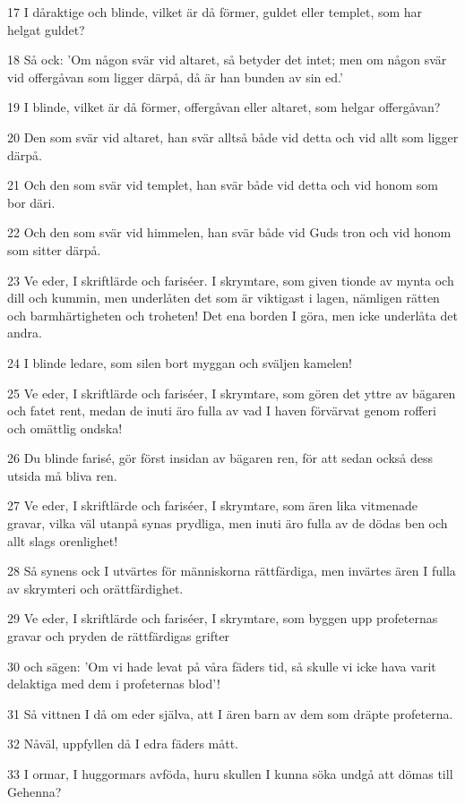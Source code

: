 \par 17 I dåraktige och blinde, vilket är då förmer, guldet eller templet, som har helgat guldet?
\par 18 Så ock: 'Om någon svär vid altaret, så betyder det intet; men om någon svär vid offergåvan som ligger därpå, då är han bunden av sin ed.'
\par 19 I blinde, vilket är då förmer, offergåvan eller altaret, som helgar offergåvan?
\par 20 Den som svär vid altaret, han svär alltså både vid detta och vid allt som ligger därpå.
\par 21 Och den som svär vid templet, han svär både vid detta och vid honom som bor däri.
\par 22 Och den som svär vid himmelen, han svär både vid Guds tron och vid honom som sitter därpå.
\par 23 Ve eder, I skriftlärde och fariséer. I skrymtare, som given tionde av mynta och dill och kummin, men underlåten det som är viktigast i lagen, nämligen rätten och barmhärtigheten och troheten! Det ena borden I göra, men icke underlåta det andra.
\par 24 I blinde ledare, som silen bort myggan och sväljen kamelen!
\par 25 Ve eder, I skriftlärde och fariséer, I skrymtare, som gören det yttre av bägaren och fatet rent, medan de inuti äro fulla av vad I haven förvärvat genom rofferi och omättlig ondska!
\par 26 Du blinde farisé, gör först insidan av bägaren ren, för att sedan också dess utsida må bliva ren.
\par 27 Ve eder, I skriftlärde och fariséer, I skrymtare, som ären lika vitmenade gravar, vilka väl utanpå synas prydliga, men inuti äro fulla av de dödas ben och allt slags orenlighet!
\par 28 Så synens ock I utvärtes för människorna rättfärdiga, men invärtes ären I fulla av skrymteri och orättfärdighet.
\par 29 Ve eder, I skriftlärde och fariséer, I skrymtare, som byggen upp profeternas gravar och pryden de rättfärdigas grifter
\par 30 och sägen: 'Om vi hade levat på våra fäders tid, så skulle vi icke hava varit delaktiga med dem i profeternas blod'!
\par 31 Så vittnen I då om eder själva, att I ären barn av dem som dräpte profeterna.
\par 32 Nåväl, uppfyllen då I edra fäders mått.
\par 33 I ormar, I huggormars avföda, huru skullen I kunna söka undgå att dömas till Gehenna?
